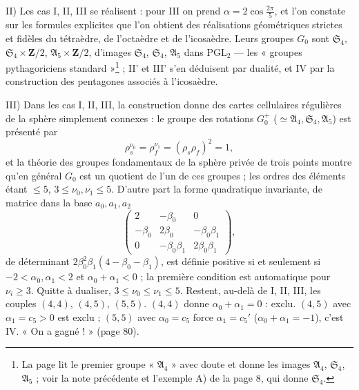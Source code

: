 \documentclass[11pt,a4paper]{article}
\begin{document}
II) Les cas I, II, III se réalisent : pour III on prend $\alpha = 2\cos\frac{2\pi}5$,
et l'on constate sur les formules explicites que l'on obtient des réalisations
géométriques strictes et fidèles du tétraèdre, de l'octaèdre et de l'icosaèdre.
Leurs groupes $G_0$ sont $\mathfrak{S}_4$, $\mathfrak{S}_4 \times \mathbf{Z}/2$,
$\mathfrak{A}_5 \times \mathbf{Z}/2$, d'images $\mathfrak{S}_4$, $\mathfrak{S}_4$,
$\mathfrak{A}_5$ dans $\mathrm{PGL}_2$ --- les « groupes pythagoriciens
standard »\footnote{La page lit le premier groupe « $\mathfrak{A}_4$ » avec doute
et donne les images $\mathfrak{A}_4$, $\mathfrak{S}_4$, $\mathfrak{A}_5$ ; voir la
note précédente et l'exemple A) de la page 8, qui donne $\mathfrak{S}_4$.} ; II'
et III' s'en déduisent par dualité, et IV par la construction des pentagones
associés à l'icosaèdre.

III) Dans les cas I, II, III, la construction donne des cartes cellulaires
régulières de la sphère simplement connexes : le groupe des rotations $G_0^+$
(${}\simeq \mathfrak{A}_4, \mathfrak{S}_4, \mathfrak{A}_5$) est présenté par
\[
  \rho_s^{\nu_0} = \rho_f^{\nu_1} = (\rho_s\rho_f)^2 = 1 ,
\]
et la théorie des groupes fondamentaux de la sphère privée de trois points
montre qu'en général $G_0$ est un quotient de l'un de ces groupes ; les ordres
des éléments étant $\leq 5$, $3 \leq \nu_0, \nu_1 \leq 5$. D'autre part la forme
quadratique invariante, de matrice dans la base $a_0, a_1, a_2$
\[
  \begin{pmatrix}
    2 & -\beta_0 & 0 \\
    -\beta_0 & 2\beta_0 & -\beta_0\beta_1 \\
    0 & -\beta_0\beta_1 & 2\beta_0\beta_1
  \end{pmatrix},
\]
de déterminant $2\beta_0^2\beta_1(4 - \beta_0 - \beta_1)$, est définie
positive si et seulement si $-2 < \alpha_0, \alpha_1 < 2$ et $\alpha_0 +
\alpha_1 < 0$ ; la première condition est automatique pour $\nu_i \geq 3$.
Quitte à dualiser, $3 \leq \nu_0 \leq \nu_1 \leq 5$. Restent, au-delà de I, II,
III, les couples $(4, 4)$, $(4, 5)$, $(5, 5)$. $(4, 4)$ donne $\alpha_0 +
\alpha_1 = 0$ : exclu. $(4, 5)$ avec $\alpha_1 = c_5 > 0$ est exclu ; $(5, 5)$
avec $\alpha_0 = c_5$ force $\alpha_1 = c_5'$ ($\alpha_0 + \alpha_1 = -1$),
c'est IV. « On a gagné ! » (page 80).
\end{document}
